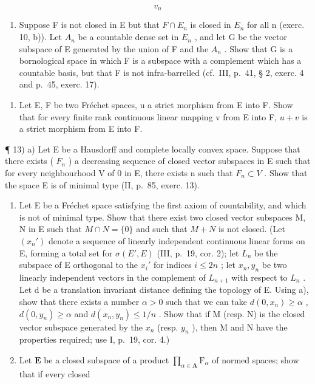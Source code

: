 \[
v _ {n}
\]

\begin{enumerate}
\def\labelenumi{\alph{enumi})}
\setcounter{enumi}{1}
\tightlist
\item
  Suppose F is not closed in E but that \(F \cap E_{n}\) is closed in \(E_{n}\) for all n (exerc. 10, b)). Let \(A_{n}\) be a countable dense set in \(E_{n}\) , and let G be the vector subspace of E generated by the union of F and the \(A_{n}\) . Show that G is a bornological space in which F is a subspace with a complement which has a countable basis, but that F is not infra-barrelled (cf.~III, p.~41, § 2, exerc. 4 and p.~45, exerc. 17).
\end{enumerate}

\begin{enumerate}
\def\labelenumi{\arabic{enumi})}
\setcounter{enumi}{11}
\tightlist
\item
  Let E, F be two Fréchet spaces, u a strict morphism from E into F. Show that for every finite rank continuous linear mapping v from E into F, \(u + v\) is a strict morphism from E into F.
\end{enumerate}

¶ 13) a) Let E be a Hausdorff and complete locally convex space. Suppose that there exists ( \(F_{n}\) ) a decreasing sequence of closed vector subspaces in E such that for every neighbourhood V of 0 in E, there exists n such that \(F_{n} \subset V\) . Show that the space E is of minimal type (II, p.~85, exerc. 13).

\begin{enumerate}
\def\labelenumi{\alph{enumi})}
\setcounter{enumi}{1}
\item
  Let E be a Fréchet space satisfying the first axiom of countability, and which is not of minimal type. Show that there exist two closed vector subspaces M, N in E such that \(M \cap N = \{0\}\) and such that \(M + N\) is not closed. (Let \((x_{n}')\) denote a sequence of linearly independent continuous linear forms on E, forming a total set for \(\sigma(E', E)\) (III, p.~19, cor. 2); let \(L_{n}\) be the subspace of E orthogonal to the \(x_{i}'\) for indices \(i \leqslant 2n\) ; let \(x_{n}, y_{n}\) be two linearly independent vectors in the complement of \(L_{n+1}\) with respect to \(L_{n}\) . Let d be a translation invariant distance defining the topology of E. Using a), show that there exists a number \(\alpha > 0\) such that we can take \(d(0, x_{n}) \geqslant \alpha\) , \(d(0, y_{n}) \geqslant \alpha\) and \(d(x_{n}, y_{n}) \leqslant 1/n\) . Show that if M (resp. N) is the closed vector subspace generated by the \(x_{n}\) (resp. \(y_{n}\) ), then M and N have the properties required; use I, p.~19, cor. 4.)
\item
  Let \(\mathbf{E}\) be a closed subspace of a product \(\prod_{\alpha \in \mathbf{A}} \mathrm{F}_{\alpha}\) of normed spaces; show that if every closed
\end{enumerate}

